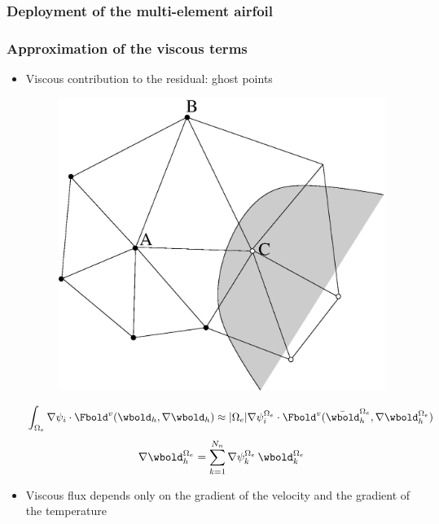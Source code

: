 \begin{frame}
   \frametitle{Deployment of the multi-element airfoil}
  \begin{center}
  \end{center}
\end{frame}


\begin{frame}
\frametitle{Approximation of the viscous terms}
\begin{itemize}
\item Viscous contribution to the residual: ghost points
\begin{figure}[!ht]
  \centering
  \includegraphics[width=0.35\linewidth]{Fig/GhostFEM_e}
\end{figure}
\begin{equation*}
\int_{\Omega_e}\nabla \psi_i \cdot \Fbold^v(\wbold_h, \nabla \wbold_h) \approx
|\Omega_e| \nabla \psi_i^{\Omega_e} \cdot \Fbold^v(\bar{\wbold}^{\Omega_e}_h, \nabla \wbold^{\Omega_e}_h)
\end{equation*}
\begin{equation*}
\nabla \wbold^{\Omega_e}_h = \sum_{k=1}^{N_n} \nabla \psi_k^{\Omega_e} \, \wbold_k^{\Omega_e}
\end{equation*}
\item Viscous flux depends only on the gradient of the velocity and the gradient of the temperature
\end{itemize}
\end{frame}

